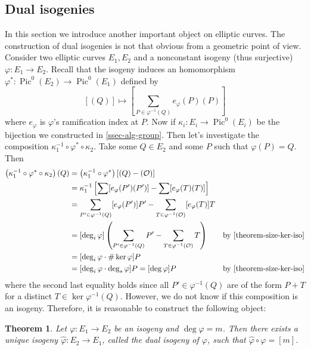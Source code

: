 \documentclass[12pt]{article}
\newtheorem{theorem}{Theorem}[subsection]
\theoremstyle{remark}
\theoremstyle{definition}
\newcommand{\ecO}[0]{\mathcal O}
\newcommand{\kp}[0]{\kappa}
\newcommand{\Pic}[0]{\operatorname{Pic}}
\begin{document}
        
        \subsection{Dual isogenies}
        In this section we introduce another important object on elliptic curves. The construction of dual isogenies is not that obvious from a geometric point of view. Consider two elliptic curves $E_1, E_2$ and a nonconstant isogeny (thus surjective) $\varphi:E_1\to E_2$. Recall that the isogeny induces an homomorphism $\varphi^*:\Pic^0(E_2)\to\Pic^0(E_1)$ defined by
        \[\left[(Q)\right]\mapsto \left[\sum_{P\in\varphi^{-1}(Q)}e_{\varphi}(P)(P)\right]\]
        where $e_\varphi$ is $\varphi$'s ramification index at $P$. Now if $\kp_i:E_i\to \Pic^0(E_i)$ be the bijection we constructed in \autoref{ssec-alg-group}. Then let's investigate the composition $\kp_1^{-1}\circ\varphi^*\circ\kp_2$. Take some $Q\in E_2$ and some $P$ such that $\varphi(P)=Q$. Then
        \begin{align*}
            \left(\kp_1^{-1}\circ\varphi^*\circ\kp_2\right)(Q)&=\left(\kp_1^{-1}\circ\varphi^*\right)[(Q)-(\ecO)]&\\
            &=\kp_1^{-1}\left[\sum[e_\varphi(P')(P')]-\sum[e_{\varphi}(T)(T)]\right]&\\
            &=\sum_{P'\in \varphi^{-1}(Q)}[e_\varphi(P')]P'-\sum_{T\in \varphi^{-1}(\ecO)}[e_{\varphi}(T)]T&\\
            &=[\deg_i\varphi]\left(\sum_{P'\in\varphi^{-1}(Q)}P'-\sum_{T\in\varphi^{-1}(\ecO)}T\right)&\text{by \autoref{theorem-size-ker-iso}}\\
            &=[\deg_i\varphi\cdot\#\ker\varphi] P&\\
            &=[\deg_i\varphi\cdot\deg_s\varphi]P=[\deg\varphi]P&\text{by \autoref{theorem-size-ker-iso}}
        \end{align*}
        where the second last equality holds since all $P'\in \varphi^{-1}(Q)$ are of the form $P+T$ for a distinct $T\in \ker\varphi^{-1}({Q})$. However, we do not know if this composition is an isogeny. Therefore, it is reasonable to construct the following object:
        \begin{theorem}\label{theorem-dual-iso-exist}
            Let $\varphi:E_1\to E_2$ be an isogeny and $\deg\varphi=m$. Then there exists a unique isogeny $\hat\varphi:E_2\to E_1$, called \textup{the dual isogeny of $\varphi$}, such that $\hat\varphi\circ\varphi=[m]$.
        \end{theorem}
\end{document}

